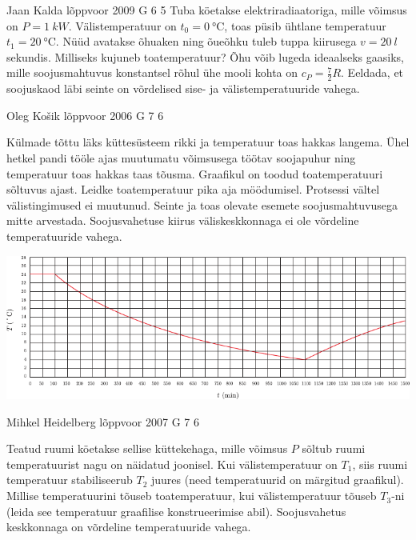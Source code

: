 \documentclass[11pt]{article}
\begin{document}
{%
{Jaan Kalda} %
{lõppvoor} %
{2009} %
{G 6} %
{5} %
{
\ifStatement
Tuba köetakse elektriradiaatoriga, mille võimsus on $P=\SI{1}{kW}$. Välistemperatuur on $t_0=\SI{0}{\celsius}$, toas püsib ühtlane temperatuur $t_1=\SI{20}{\celsius}$.
Nüüd avatakse õhuaken ning õueõhku tuleb tuppa kiirusega $v=\SI{20}{l}$ sekundis. Milliseks kujuneb toatemperatuur? Õhu võib lugeda ideaalseks gaasiks,
mille soojusmahtuvus konstantsel rõhul ühe mooli kohta on $c_P=\frac 72R$. Eeldada, et soojuskaod läbi seinte on võrdelised sise- ja välistemperatuuride vahega.
\fi
}

{Oleg Košik} %
{lõppvoor} %
{2006} %
{G 7} %
{6} %
{
\ifStatement
Külmade tõttu läks küttesüsteem rikki ja temperatuur toas hakkas langema. Ühel hetkel pandi tööle ajas muutumatu võimsusega töötav soojapuhur ning temperatuur toas hakkas taas tõusma. Graafikul on toodud toatemperatuuri sõltuvus ajast. Leidke toatemperatuur pika aja möödumisel. Protsessi vältel välistingimused ei muutunud. Seinte ja toas olevate esemete soojusmahtuvusega mitte arvestada. Soojusvahetuse kiirus väliskeskkonnaga ei ole võrdeline temperatuuride vahega.

\begin{center}
	\includegraphics[width=\linewidth]{2006-v3g-07-yl}
\end{center}
\fi
}

{Mihkel Heidelberg} %
{lõppvoor} %
{2007} %
{G 7} %
{6} %
{
\ifStatement
Teatud ruumi köetakse sellise küttekehaga, mille võimsus $P$ sõltub ruumi temperatuurist nagu on näidatud joonisel. Kui välistemperatuur on $T_1$, siis ruumi temperatuur stabiliseerub $T_2$ juures (need temperatuurid on märgitud graafikul). Millise temperatuurini tõuseb toatemperatuur, kui välistemperatuur tõuseb $T_3$-ni (leida see temperatuur graafilise konstrueerimise abil). Soojusvahetus keskkonnaga on võrdeline temperatuuride vahega.

}}
\end{document}
